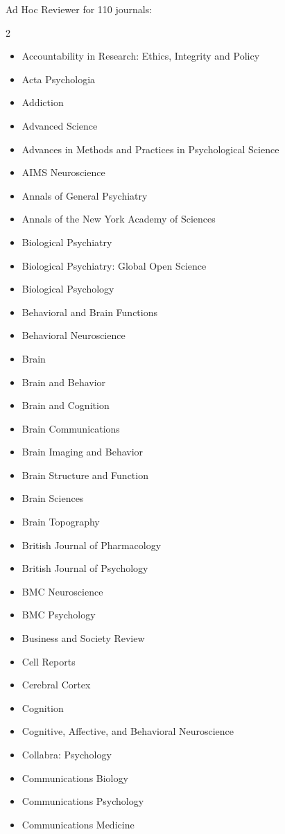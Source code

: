 \documentclass[11pt, letterpaper]{article}
\begin{document}
Ad Hoc Reviewer for 110 journals:
\begin{multicols}{2}
\begin{itemize}[noitemsep]
\itshape

\item Accountability in Research: Ethics, Integrity and Policy
\item Acta Psychologia
\item Addiction
\item Advanced Science
\item Advances in Methods and Practices in Psychological Science
\item AIMS Neuroscience
\item Annals of General Psychiatry
\item Annals of the New York Academy of Sciences
\item Biological Psychiatry
\item Biological Psychiatry: Global Open Science
\item Biological Psychology
\item Behavioral and Brain Functions
\item Behavioral Neuroscience
\item Brain
\item Brain and Behavior
\item Brain and Cognition
\item Brain Communications
\item Brain Imaging and Behavior
\item Brain Structure and Function
\item Brain Sciences
\item Brain Topography
\item British Journal of Pharmacology
\item British Journal of Psychology
\item BMC Neuroscience 
\item BMC Psychology
\item Business and Society Review
\item Cell Reports
\item Cerebral Cortex 
\item Cognition
\item Cognitive, Affective, and Behavioral Neuroscience 
\item Collabra: Psychology
\item Communications Biology
\item Communications Psychology
\item Communications Medicine 

\end{itemize}
\end{multicols}
\end{document}
